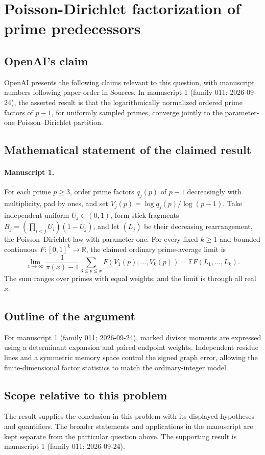 \documentclass[11pt]{article}
\begin{document}
\section*{Poisson-Dirichlet factorization of prime predecessors}

\subsection{OpenAI's claim}
OpenAI presents the following claims relevant to this question, with manuscript numbers following paper order in Sources. In manuscript 1 (family 011; 2026-09-24), the asserted result is that the logarithmically normalized ordered prime factors of $p-1$, for uniformly sampled primes, converge jointly to the parameter-one Poisson--Dirichlet partition.

\subsection{Mathematical statement of the claimed result}
\paragraph{Manuscript 1.}
For each prime $p\ge3$, order prime factors $q_j(p)$ of $p-1$ decreasingly with multiplicity, pad by ones, and set $V_j(p)=\log q_j(p)/\log(p-1)$. Take independent uniform $U_j\in(0,1)$, form stick fragments $B_j=(\prod_{i<j}U_i)(1-U_j)$, and let $(L_j)$ be their decreasing rearrangement, the Poisson--Dirichlet law with parameter one. For every fixed $k\ge1$ and bounded continuous $F:[0,1]^k\to\mathbb R$, the claimed ordinary prime-average limit is
\[
 \lim_{x\to\infty}\frac1{\pi(x)-1}\sum_{3\le p\le x}F(V_1(p),\ldots,V_k(p))
 =\mathbb EF(L_1,\ldots,L_k).
\]
The sum ranges over primes with equal weights, and the limit is through all real $x$.

\subsection{Outline of the argument}
For manuscript 1 (family 011; 2026-09-24), marked divisor moments are expressed using a determinant expansion and paired endpoint weights. Independent residue lines and a symmetric memory space control the signed graph error, allowing the finite-dimensional factor statistics to match the ordinary-integer model.

\subsection{Scope relative to this problem}
The result supplies the conclusion in this problem with its displayed hypotheses and quantifiers. The broader statements and applications in the manuscript are kept separate from the particular question above. The supporting result is manuscript 1 (family 011; 2026-09-24).
\end{document}

